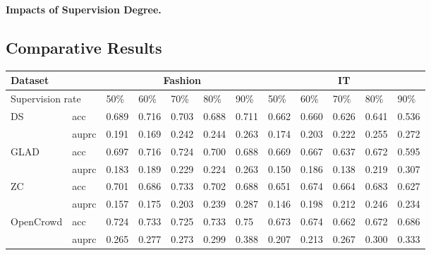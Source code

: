 \smallskip
\noindent\textbf{Impacts of Supervision Degree.}

\subsection{Comparative Results}
\begin{table*}[!h]
\begin{tabular}{|l|l|l|l|l|l|l|l|l|l|l|l|}
\hline
\multicolumn{2}{|l|}{Dataset}          & \multicolumn{5}{c|}{Fashion}          & \multicolumn{5}{c|}{IT}               \\ \hline
\multicolumn{2}{|l|}{Supervision rate} & 50\%  & 60\%  & 70\%  & 80\%  & 90\%  & 50\%  & 60\%  & 70\%  & 80\%  & 90\%  \\ \hline
\multirow{2}{*}{DS}          & acc     & 0.689 & 0.716 & 0.703 & 0.688 & 0.711 & 0.662 & 0.660 & 0.626 & 0.641 & 0.536 \\ \cline{2-12} 
                             & auprc   & 0.191 & 0.169 & 0.242 & 0.244 & 0.263 & 0.174 & 0.203 & 0.222 & 0.255 & 0.272 \\ \hline
\multirow{2}{*}{GLAD}        & acc     & 0.697 & 0.716 & 0.724 & 0.700 & 0.688 & 0.669 & 0.667 & 0.637 & 0.672 & 0.595 \\ \cline{2-12} 
                             & auprc   & 0.183 & 0.189 & 0.229 & 0.224 & 0.263 & 0.150 & 0.186 & 0.138 & 0.219 & 0.307 \\ \hline
\multirow{2}{*}{ZC}          & acc     & 0.701 & 0.686 & 0.733 & 0.702 & 0.688 & 0.651 & 0.674 & 0.664 & 0.683 & 0.627 \\ \cline{2-12} 
                             & auprc   & 0.157 & 0.175 & 0.203 & 0.239 & 0.287 & 0.146 & 0.198 & 0.212 & 0.246 & 0.234 \\ \hline
\multirow{2}{*}{OpenCrowd}   & acc     & 0.724 & 0.733 & 0.725 & 0.733 & 0.75  & 0.673 &   0.674  &   0.662     &     0.672   &   0.686    \\ \cline{2-12} 
                             & auprc   & 0.265 & 0.277 & 0.273 & 0.299 & 0.388  &  0.207     &   0.213    &  0.267     &  0.300  &  0.333 \\ \hline
\end{tabular}
\end{table*}
\label{sec:compres}
